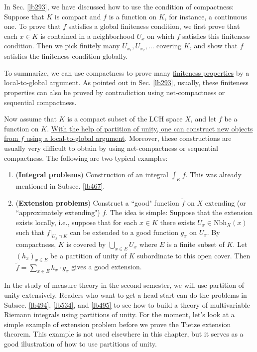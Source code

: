 \documentclass[12pt,b5paper,notitlepage]{article}
\theoremstyle{definition}
\theoremstyle{plain}
\newcommand{\wtd}{\widetilde}
\newcommand{\Nbh}{\mathrm{Nbh}}
\numberwithin{equation}{section}
\begin{document}
In Sec. \ref{lb293}, we have discussed how to use the condition of compactness: Suppose that $K$ is compact and $f$ is a function on $K$, for instance, a continuous one. To prove that $f$ satisfies a global finiteness condition, we first prove that each $x\in K$ is contained in a neighborhood $U_x$ on which $f$ satisfies this finiteness condition. Then we pick finitely many $U_{x_1},U_{x_2},\dots$ covering $K$, and show that $f$ satisfies the finiteness condition globally. 

To summarize, we can use compactness to prove many \uline{finiteness properties} by a local-to-global argument. As pointed out in Sec. \ref{lb293}, usually, these finiteness properties can also be proved by contradiction using net-compactness or sequential compactness.

Now assume that $K$ is a compact subset of the LCH space $X$, and let $f$ be a function on $K$. \uline{With the help of partition of unity, one can construct new objects from $f$ using a local-to-global argument}. Moreover, these constructions are usually very difficult to obtain by using net-compactness or sequential compactness. The following are two typical examples:
\begin{enumerate}
\item (\textbf{Integral problems}) Construction of an integral $\int_Kf$. This was already mentioned in Subsec. \ref{lb467}.
\item (\textbf{Extension problems}) Construct a ``good" function $\wtd f$ on $X$ extending (or ``approximately extending") $f$. The idea is simple: Suppose that the extension exists locally, i.e., suppose that for each $x\in K$ there exists $U_x\in\Nbh_X(x)$ such that $f|_{U_x\cap K}$ can be extended to a good function $g_x$ on $U_x$. By compactness, $K$ is covered by $\bigcup_{x\in E}U_x$ where $E$ is a finite subset of $K$. Let $(h_x)_{x\in E}$ be a partition of unity of $K$ subordinate to this open cover.  Then $\wtd f=\sum_{x\in E}h_x\cdot g_x$ gives a good extension.
\end{enumerate}

In the study of measure theory in the second semester, we will use partition of unity extensively. Readers who want to get a head start can do the problems in Subsec. \ref{lb494}, \ref{lb534}, and \ref{lb495} to see how to build a theory of multivariable Riemann integrals using partitions of unity. For the moment, let's look at a simple example of extension problem before we prove the Tietze extension theorem. This example is not used elsewhere in this chapter, but it serves as a good illustration of how to use partitions of unity.
\end{document}
